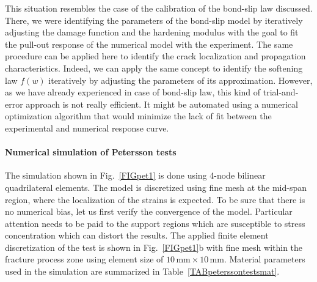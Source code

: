 \documentclass[main.tex]{subfiles}
\begin{document}
This situation resembles the case of the calibration of the bond-slip law discussed.
There, we were identifying the parameters of the bond-slip model by iteratively adjusting the damage function and the hardening modulus with the goal to fit the pull-out response of the numerical model with the experiment. 
The same procedure can be applied here to identify the crack localization and propagation characteristics. 
Indeed, we can apply the same concept to identify the softening law $f(w)$ iteratively by adjusting the parameters of its approximation. However, as we have already experienced in case of bond-slip law, this kind of trial-and-error approach is not really efficient. It might be automated using a numerical optimization algorithm that would minimize the lack of fit between the experimental and numerical response curve.

\paragraph{Numerical simulation of Petersson tests}
The simulation  shown in Fig.~\ref{FIGpet1} is done using 4-node bilinear quadrilateral elements. The model is discretized using fine mesh at the mid-span region, where the localization of the strains is expected. To be sure that there is no numerical bias, let us first verify the convergence of the model. Particular attention needs to be paid to the support regions which are susceptible to stress concentration which can distort the results. The applied finite element discretization of the test is shown in Fig.~\ref{FIGpet1}b with fine mesh within the fracture process zone using element size of $10\,\mathrm{mm} \times 10\,\mathrm{mm}$. Material parameters used in the simulation are summarized in Table~\ref{TABpeterssontestsmat}.
%
\end{document}
